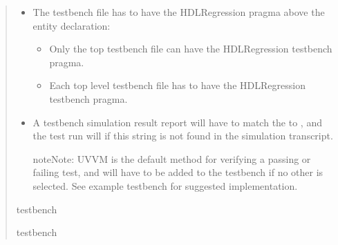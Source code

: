 \documentclass[letterpaper,10pt,english]{sphinxmanual}
\begin{document}
\begin{quote}
\begin{itemize}
\item {} 
\sphinxAtStartPar
The testbench file has to have the HDLRegression pragma above the entity declaration:
\begin{itemize}
\item {} 
\sphinxAtStartPar
Only the top testbench file can have the HDLRegression testbench pragma.

\item {} 
\sphinxAtStartPar
Each top level testbench file has to have the HDLRegression testbench pragma.

\end{itemize}

\item {} 
\sphinxAtStartPar
A testbench simulation result report will have to match the {\hyperref[\detokenize{api:set-result-check-string}]{}} to
, and the test run will  if this string is not found in the simulation transcript.

\begin{sphinxadmonition}{note}{Note:}
\sphinxAtStartPar
UVVM  is the default method for verifying a passing or failing test, and will have
to be added to the testbench if no other  is selected. See example testbench for suggested
implementation.
\end{sphinxadmonition}

\end{itemize}

\sphinxAtStartPar
{} testbench

\begin{sphinxVerbatim}[commandchars=\\\{\}]
\end{sphinxVerbatim}

\sphinxAtStartPar
{} testbench

\begin{sphinxVerbatim}[commandchars=\\\{\}]
\end{sphinxVerbatim}


\end{quote}
\end{document}
